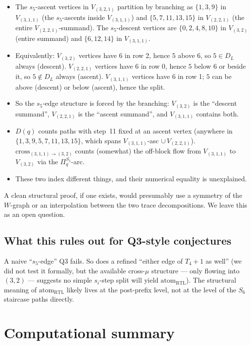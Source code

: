 \documentclass[11pt]{article}
\theoremstyle{definition}
\begin{document}
\begin{itemize}[leftmargin=2em,topsep=0.3em,itemsep=0.2em]
\item The $s_5$-ascent vertices in $V_{(3,2,1)}$ partition by branching as $\{1, 3, 9\}$ in $V_{(3,1,1)}$ (the $s_5$-ascents inside $V_{(3,1,1)}$) and $\{5, 7, 11, 13, 15\}$ in $V_{(2,2,1)}$ (the entire $V_{(2,2,1)}$-summand). The $s_5$-descent vertices are $\{0, 2, 4, 8, 10\}$ in $V_{(3,2)}$ (entire summand) and $\{6, 12, 14\}$ in $V_{(3,1,1)}$.
\item Equivalently: $V_{(3,2)}$ vertices have $6$ in row 2, hence $5$ above $6$, so $5 \in D_L$ always (descent). $V_{(2,2,1)}$ vertices have $6$ in row 0, hence $5$ below $6$ or beside it, so $5 \notin D_L$ always (ascent). $V_{(3,1,1)}$ vertices have $6$ in row 1; $5$ can be above (descent) or below (ascent), hence the split.
\item So the $s_5$-edge structure is forced by the branching: $V_{(3,2)}$ is the ``descent summand'', $V_{(2,2,1)}$ is the ``ascent summand'', and $V_{(3,1,1)}$ contains both.
\item $D(q)$ counts paths with step~11 fixed at an ascent vertex (anywhere in $\{1,3,9,5,7,11,13,15\}$, which spans $V_{(3,1,1)}$-asc $\cup\, V_{(2,2,1)}$). $\mathrm{cross}_{(3,1,1)\to(3,2)}$ counts (somewhat) the off-block flow from $V_{(3,1,1)}$ to $V_{(3,2)}$ via the $\Pi_q^{S_5}$-arc.
\item These two index different things, and their numerical equality is unexplained.
\end{itemize}

A clean structural proof, if one exists, would presumably use a symmetry of the $W$-graph or an interpolation between the two trace decompositions. We leave this as an open question.

\subsection*{What this rules out for Q3-style conjectures}

A naive ``$s_5$-edge'' Q3 fails. So does a refined ``either edge of $T_4+1$ as well'' (we did not test it formally, but the available cross-$\mu$ structure --- only flowing into $(3,2)$ --- suggests no simple $s_i$-step split will yield $\mathrm{atom}_{\mathrm{RTL}}$). The structural meaning of $\mathrm{atom}_{\mathrm{RTL}}$ likely lives at the post-prefix level, not at the level of the $S_6$ staircase paths directly.

\section{Computational summary}
\end{document}
